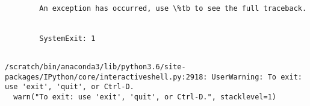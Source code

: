 \documentclass[11pt]{article}
\begin{document}
    \begin{Verbatim}[commandchars=\\\{\}]

        An exception has occurred, use \%tb to see the full traceback.


        SystemExit: 1


    \end{Verbatim}

    \begin{Verbatim}[commandchars=\\\{\}]
/scratch/bin/anaconda3/lib/python3.6/site-packages/IPython/core/interactiveshell.py:2918: UserWarning: To exit: use 'exit', 'quit', or Ctrl-D.
  warn("To exit: use 'exit', 'quit', or Ctrl-D.", stacklevel=1)

    \end{Verbatim}


    
    
    
    
\end{document}
